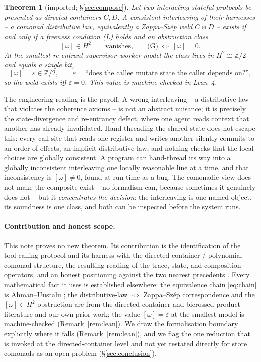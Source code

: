 \documentclass[11pt]{amsart}
\newcommand{\zs}{\bowtie}                          %
\theoremstyle{plain}
\newtheorem{theorem}{Theorem}
\theoremstyle{definition}
\theoremstyle{remark}
\begin{document}
\begin{theorem}[imported; \S\ref{sec:compose}]\label{thm:main}
Let two interacting stateful protocols be presented as directed containers $C,D$. A consistent
interleaving of their harnesses -- a comonad distributive law, equivalently a Zappa--Sz\'ep weld
$C\zs D$ -- exists if and only if a freeness condition \textup{(L)} holds and an obstruction class
\[
  [\omega]\in H^2 \qquad\text{vanishes,}\qquad \text{(G)}\ \Longleftrightarrow\ [\omega]=0 .
\]
At the smallest re-entrant supervisor--worker model the class lives in $H^2\cong\mathbb{Z}/2$ and
equals a single bit,
\[
  [\omega]=\varepsilon\in\mathbb{Z}/2,\qquad
  \varepsilon=\text{``does the callee mutate state the caller depends on?''},
\]
so the weld exists iff $\varepsilon=0$. This value is machine-checked in Lean~4.
\end{theorem}

\noindent The engineering reading is the payoff. A wrong interleaving -- a distributive law that
violates the coherence axioms -- is not an abstract nuisance; it is precisely the state-divergence
and re-entrancy defect, where one agent reads context that another has already invalidated.
Hand-threading the shared state does not escape this: every call site that reads one register and
writes another silently commits to an order of effects, an implicit distributive law, and nothing
checks that the local choices are globally consistent. A program can hand-thread its way into a
globally inconsistent interleaving one locally reasonable line at a time, and that inconsistency is
$[\omega]\ne 0$, found at run time as a bug. The comonadic view does not make the composite exist --
no formalism can, because sometimes it genuinely does not -- but it \emph{concentrates the decision}:
the interleaving is one named object, its soundness is one class, and both can be inspected before
the system runs.

\paragraph{Contribution and honest scope.}
This note proves no new theorem. Its contribution is the identification of the tool-calling protocol
and its harness with the directed-container / polynomial-comonad structure, the resulting reading of
the trace, state, and composition operators, and an honest positioning against the two nearest
precedents \cite{sessioncoalg,segura}. Every mathematical fact it uses is established elsewhere: the
equivalence chain \eqref{eq:chain} is Ahman--Uustalu \cite{dircont}; the distributive-law
$\Leftrightarrow$ Zappa--Sz\'ep correspondence and the $[\omega]\in H^2$ obstruction are from the
directed-container and bicrossed-product literature and our own prior work; the value
$[\omega]=\varepsilon$ at the smallest model is machine-checked (Remark~\ref{rem:lean}). We draw the
formalisation boundary explicitly where it falls (Remark~\ref{rem:lean}), and we flag the one
reduction that is invoked at the directed-container level and not yet restated directly for store
comonads as an open problem (\S\ref{sec:conclusion}).
\end{document}
